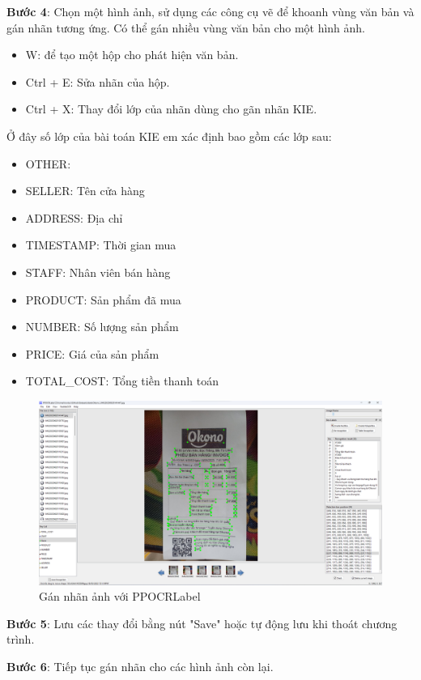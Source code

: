 \textbf{Bước 4}: Chọn một hình ảnh, sử dụng các công cụ vẽ để khoanh vùng văn bản và gán nhãn tương ứng. Có thể gán nhiều vùng văn bản cho một hình ảnh.
\begin{itemize}
    \item W: để tạo một hộp cho phát hiện văn bản.
    \item Ctrl + E: Sửa nhãn của hộp.
    \item Ctrl + X: Thay đổi lớp của nhãn dùng cho gãn nhãn KIE.
\end{itemize}
Ở đây số lớp của bài toán KIE em xác định bao gồm các lớp sau:
\begin{itemize}
    \item OTHER: 
    \item SELLER: Tên cửa hàng
    \item ADDRESS: Địa chỉ 
    \item TIMESTAMP: Thời gian mua
    \item STAFF: Nhân viên bán hàng
    \item PRODUCT: Sản phẩm đã mua
    \item NUMBER: Số lượng sản phẩm
    \item PRICE: Giá của sản phẩm
    \item TOTAL\_COST: Tổng tiền thanh toán
\end{itemize}
\begin{figure}[h]
    \includegraphics[scale=0.25]{images/GUI-ppocr-labeled.png}
    \centering
    \caption{Gán nhãn ảnh với PPOCRLabel}
\end{figure}

\textbf{Bước 5}: Lưu các thay đổi bằng nút "Save" hoặc tự động lưu khi thoát chương trình.

\textbf{Bước 6}: Tiếp tục gán nhãn cho các hình ảnh còn lại.

